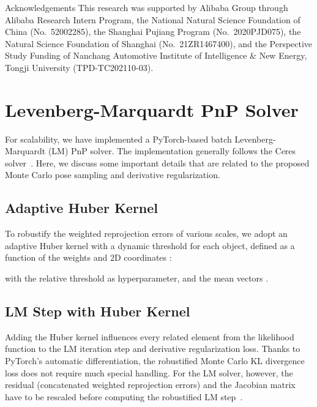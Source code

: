 \documentclass[10pt,twocolumn,letterpaper]{article}
\makeatletter
\renewcommand{\paragraph}{
  \@startsection{paragraph}{4}
  {\z@}{1.0ex \@plus 0ex \@minus .3ex}{-1em}
  {\normalfont\normalsize\bfseries}
}
\makeatother
\begin{document}
\paragraph{Acknowledgements} This research was supported by Alibaba Group through Alibaba Research Intern Program, the National Natural Science Foundation of China (No.~52002285), the Shanghai Pujiang Program (No.~2020PJD075), the Natural Science Foundation of Shanghai (No.~21ZR1467400), and the Perspective Study Funding of Nanchang Automotive Institute of Intelligence \& New Energy, Tongji University (TPD-TC202110-03).

{\small


}

\clearpage
\setcounter{section}{0}
\renewcommand{\thesection}{\Alph{section}}

\section{Levenberg-Marquardt PnP Solver}

For scalability, we have implemented a PyTorch-based batch Levenberg-Marquardt (LM) PnP solver. The implementation generally follows the Ceres solver~\cite{ceres-solver}. Here, we discuss some important details that are related to the proposed Monte Carlo pose sampling and derivative regularization.

\subsection{Adaptive Huber Kernel}

To robustify the weighted reprojection errors of various scales, we adopt an adaptive Huber kernel with a dynamic threshold  for each object, defined as a function of the weights  and 2D coordinates :

with the relative threshold  as hyperparameter, and the mean vectors .

\subsection{LM Step with Huber Kernel}

Adding the Huber kernel influences every related element from the likelihood function to the LM iteration step and derivative regularization loss. Thanks to PyTorch's automatic differentiation, the robustified Monte Carlo KL divergence loss does not require much special handling. For the LM solver, however, the residual  (concatenated weighted reprojection errors) and the Jacobian matrix  have to be rescaled before computing the robustified LM step~\cite{triggsba}.
\end{document}
